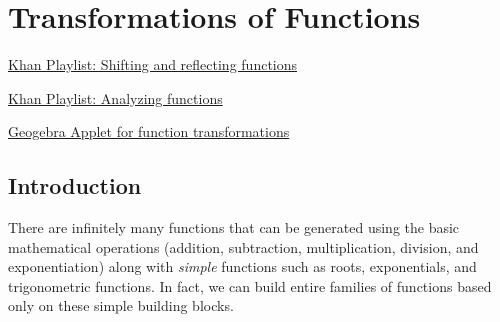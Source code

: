\section{Transformations of Functions} \label{S:0.3.Transformations}


\vspace*{-14 pt}


\begin{web}
\item
    \href{https://www.khanacademy.org/math/algebra2/functions_and_graphs/shifting-reflecting-functions/v/shifting-and-reflecting-functions}{Khan
    Playlist: Shifting and reflecting functions}
\item
    \href{https://www.khanacademy.org/math/algebra2/functions_and_graphs/analyzing_functions}{Khan
    Playlist: Analyzing functions}
\item
    \href{http://www.geogebratube.org/student/m93018}{Geogebra Applet for function
    transformations}
\end{web}

\nin \hrulefill


\subsection*{Introduction}
There are infinitely many functions that can be generated using the basic mathematical
operations (addition, subtraction, multiplication, division, and exponentiation) along
with {\it simple} functions such as roots, exponentials, and trigonometric functions.  In
fact, we can build entire families of functions based only on these simple building
blocks.




